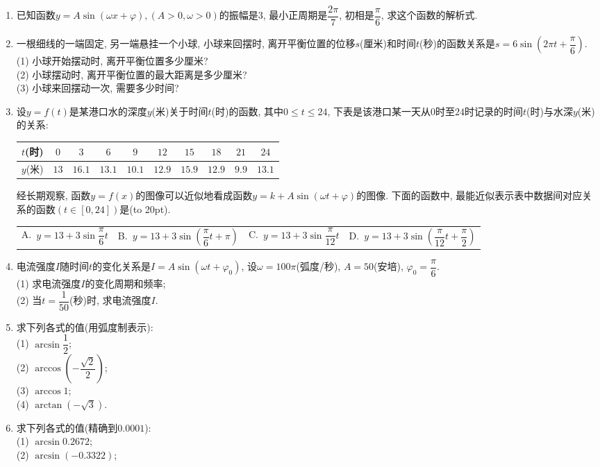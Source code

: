 \documentclass[10pt,a4paper]{article}
\newcommand{\bracket}[1]{(\hbox to #1pt{})}
\newcommand{\fourch}[4]{\par\begin{tabular}{p{.23\textwidth}p{.23\textwidth}p{.23\textwidth}p{.23\textwidth}}
A.~#1 &B.~#2& C.~#3& D.~#4
\end{tabular}}
\begin{document}
\begin{enumerate}[1.]
\item 已知函数$y=A\sin (\omega x+\varphi),(A>0,\omega >0)$的振幅是$3$, 最小正周期是$\dfrac{2\pi}7$, 初相是$\dfrac{\pi}6$, 求这个函数的解析式.
\item 一根细线的一端固定, 另一端悬挂一个小球, 小球来回摆时, 离开平衡位置的位移$s$(厘米)和时间$t$(秒)的函数关系是$s=6\sin (2\pi t+\dfrac{\pi}6)$.\\
(1) 小球开始摆动时, 离开平衡位置多少厘米?\\
(2) 小球摆动时, 离开平衡位置的最大距离是多少厘米?\\
(3) 小球来回摆动一次, 需要多少时间?
\item 设$y=f(t)$是某港口水的深度$y$(米)关于时间$t$(时)的函数, 其中$0\le t\le 24$, 下表是该港口某一天从$0$时至$24$时记录的时间$t$(时)与水深$y$(米)的关系:
\begin{center}
    \begin{tabular}{|c|c|c|c|c|c|c|c|c|c|}
        \hline
        $t$(时) & $0$ & $3$ & $6$ & $9$ & $12$ & $15$ & $18$ & $21$ & $24$ \\ \hline
        $y$(米)	& $13$ & $16.1$ & $13.1$ & $10.1$ & $12.9$ & $15.9$ & $12.9$ & $9.9$ & $13.1$ \\ \hline
    \end{tabular}
\end{center}
经长期观察, 函数$y=f(x)$的图像可以近似地看成函数$y=k+A\sin (\omega t+\varphi)$的图像.
下面的函数中, 最能近似表示表中数据间对应关系的函数$(t\in [0,24])$是\bracket{20}.
\fourch{$y=13+3\sin \dfrac{\pi}6t$}{$y=13+3\sin (\dfrac{\pi}6t+\pi)$}{$y=13+3\sin \dfrac{\pi}{12}t$}{$y=13+3\sin (\dfrac{\pi}{12}t+\dfrac{\pi}2)$}
\item 电流强度$I$随时间$t$的变化关系是$I=A\sin (\omega t+\varphi _0)$, 设$\omega =100\pi$(弧度/秒), $A=50$(安培), $\varphi _0=\dfrac{\pi}6$.\\
(1) 求电流强度$I$的变化周期和频率;\\
(2) 当$t=\dfrac 1{50}$(秒)时, 求电流强度$I$.
\item 求下列各式的值(用弧度制表示):\\
(1) $\arcsin \dfrac 12$;\\
(2) $\arccos (-\dfrac{\sqrt 2}2)$;\\
(3) $\arccos 1$;\\
(4) $\arctan (-\sqrt 3)$.
\item 求下列各式的值(精确到$0.0001$):\\
(1) $\arcsin 0.2672$;\\
(2) $\arcsin (-0.3322)$;\\

\end{enumerate}
\end{document}
